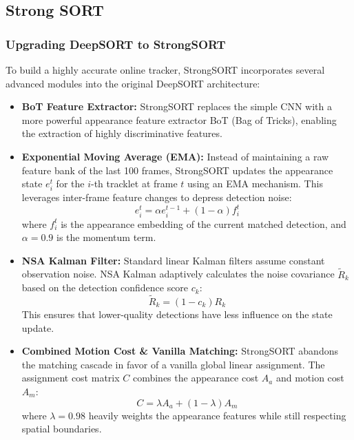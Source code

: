 \documentclass[10pt,twocolumn,letterpaper]{article}
\begin{document}
\subsection{Strong SORT}
\subsubsection{Upgrading DeepSORT to \cite{strongsort}StrongSORT}
To build a highly accurate online tracker, StrongSORT incorporates several advanced modules into the original DeepSORT architecture:

\begin{itemize}
    \item \textbf{BoT Feature Extractor:} StrongSORT replaces the simple CNN with a more powerful appearance feature extractor BoT (Bag of Tricks), enabling the extraction of highly discriminative features.
    
    \item \textbf{Exponential Moving Average (EMA):} Instead of maintaining a raw feature bank of the last 100 frames, StrongSORT updates the appearance state $e_i^t$ for the $i$-th tracklet at frame $t$ using an EMA mechanism. This leverages inter-frame feature changes to depress detection noise:
    \begin{equation}
        e_i^t = \alpha e_i^{t-1} + (1-\alpha)f_i^t
    \end{equation}
    where $f_i^t$ is the appearance embedding of the current matched detection, and $\alpha = 0.9$ is the momentum term.
    
    \item \textbf{NSA Kalman Filter:} Standard linear Kalman filters assume constant observation noise. NSA Kalman adaptively calculates the noise covariance $\tilde{R}_k$ based on the detection confidence score $c_k$:
    \begin{equation}
        \tilde{R}_k = (1 - c_k)R_k
    \end{equation}
    This ensures that lower-quality detections have less influence on the state update.
    
    \item \textbf{Combined Motion Cost \& Vanilla Matching:} StrongSORT abandons the matching cascade in favor of a vanilla global linear assignment. The assignment cost matrix $C$ combines the appearance cost $A_a$ and motion cost $A_m$:
    \begin{equation}
        C = \lambda A_a + (1-\lambda)A_m
    \end{equation}
    where $\lambda = 0.98$ heavily weights the appearance features while still respecting spatial boundaries.
\end{itemize}
\end{document}
